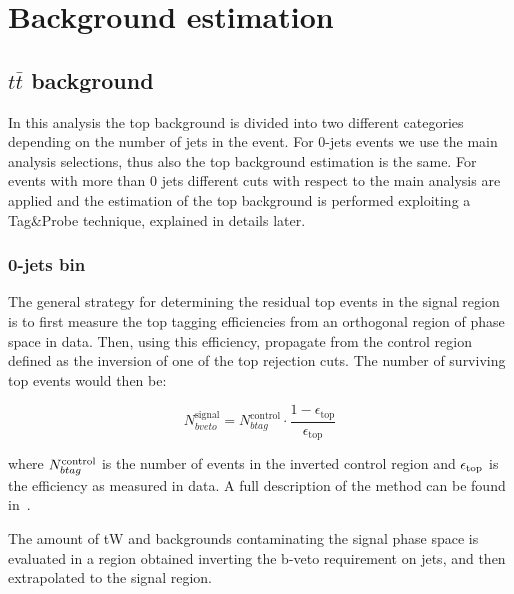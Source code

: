 \section{Background estimation}
\label{sec:Backgrounds}



\subsection{$t\bar{t}$ background \label{sec:TTBackground}}

In this analysis the top background is divided into two different categories depending on the number of jets in the event. For 0-jets events we use the main analysis selections, thus also the top background estimation is the same. For events with more than 0 jets different cuts with respect to the main analysis are applied and the estimation of the top background is performed exploiting a Tag\&Probe technique, explained in details later.

\subsubsection{0-jets bin}
The general strategy for determining the residual top events in the signal region is to first measure the top tagging efficiencies from an orthogonal region of phase space in data.  Then, using this efficiency, propagate from the control region defined as the inversion of one of the top rejection cuts.
The number of surviving top events would then be:

\begin{equation}
 N^{\mathrm{signal}}_{bveto} = N^{\mathrm{control}}_{btag} \cdot \frac{1-\epsilon_{\mathrm{top}}}{\epsilon_{\mathrm{top}}}
\label{eq:top_equation}
\end{equation}

where $N^{\rm control}_{btag}$ is the number of events in the inverted
control region and $\epsilon_{\rm top}$ is the efficiency as measured
in data. A full description of the method can be found in~\cite{AN-2013-022}. 

The amount of tW and \ttbar backgrounds contaminating the signal phase space is
evaluated in a region obtained inverting the b-veto requirement on jets, and
then extrapolated to the signal region. 

